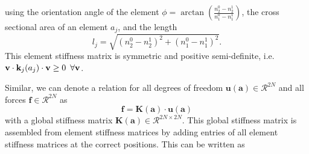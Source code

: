 using the orientation angle of the element $\phi = \arctan\left(\frac{n^0_2-n^1_2}{n^0_1-n^1_1}\right)$, the cross sectional area of an element $a_j$, and the length 
\begin{equation}
    l_j = \sqrt{(n^0_2-n^1_2)^2 + (n^0_1-n^1_1)^2}.
\end{equation}
This element stiffness matrix is symmetric and positive semi-definite, i.e. $\mathbf{v} \cdot \mathbf{k}_j(a_j) \cdot \mathbf{v} \ge 0 \hspace{0.5em} \forall \mathbf{v}$. 

Similar, we can denote a relation for all degrees of freedom $\mathbf{u} (\mathbf{a}) \in \mathcal{R}^{2N}$ and all forces $\mathbf{f} \in \mathcal{R}^{2N}$ as 
\begin{equation}
    \mathbf{f} = \mathbf{K}(\mathbf{a}) \cdot  \mathbf{u} (\mathbf{a})
    \label{eq:global_stiffness}
\end{equation}
with a global stiffness matrix $\mathbf{K} (\mathbf{a}) \in \mathcal{R}^{2N \times 2N}$. This global stiffness matrix is assembled from element stiffness matrices by adding entries of all element stiffness matrices at the correct positions. This can be written as 
